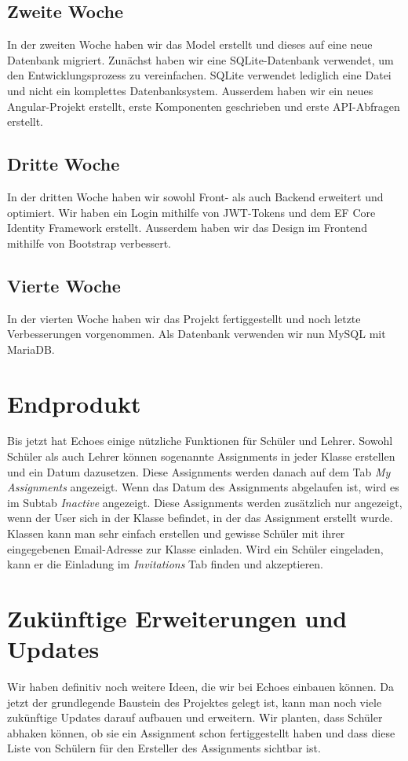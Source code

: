 \documentclass[a4paper, titlepage]{article}
\begin{document}
    \subsection{Zweite Woche}
    In der zweiten Woche haben wir das Model erstellt und dieses auf eine neue Datenbank migriert. Zunächst haben wir eine SQLite-Datenbank
    verwendet, um den Entwicklungsprozess zu vereinfachen. SQLite verwendet lediglich eine Datei und nicht ein komplettes Datenbanksystem.
    Ausserdem haben wir ein neues Angular-Projekt erstellt, erste Komponenten geschrieben und erste API-Abfragen erstellt.
    \subsection{Dritte Woche}
    In der dritten Woche haben wir sowohl Front- als auch Backend erweitert und optimiert. Wir haben ein Login mithilfe von JWT-Tokens und dem EF Core
    Identity Framework erstellt. Ausserdem haben wir das Design im Frontend mithilfe von Bootstrap verbessert.
    \subsection{Vierte Woche}
    In der vierten Woche haben wir das Projekt fertiggestellt und noch letzte Verbesserungen vorgenommen. Als Datenbank verwenden wir nun MySQL mit
    MariaDB.

    \section{Endprodukt}
    Bis jetzt hat Echoes einige nützliche Funktionen für Schüler und Lehrer. Sowohl Schüler als auch Lehrer können sogenannte Assignments 
    in jeder Klasse erstellen und ein Datum dazusetzen. Diese Assignments werden danach auf dem Tab \emph{My Assignments} angezeigt. 
    Wenn das Datum des Assignments abgelaufen ist, wird es im Subtab \emph{Inactive} angezeigt. Diese Assignments werden zusätzlich nur angezeigt, 
    wenn der User sich in der Klasse befindet, in der das Assignment erstellt wurde. Klassen kann man sehr einfach erstellen und gewisse Schüler 
    mit ihrer eingegebenen Email-Adresse zur Klasse einladen. Wird ein Schüler eingeladen, kann er die Einladung im \emph{Invitations} Tab 
    finden und akzeptieren.
    
    \section{Zukünftige Erweiterungen und Updates}
    Wir haben definitiv noch weitere Ideen, die wir bei Echoes einbauen können. Da jetzt der grundlegende Baustein des Projektes gelegt ist, 
    kann man noch viele zukünftige Updates darauf aufbauen und erweitern. Wir planten, dass Schüler abhaken können, ob sie ein Assignment schon fertiggestellt haben und dass diese Liste von Schülern für den Ersteller des Assignments sichtbar ist.
    


    \newpage
  
\end{document}
